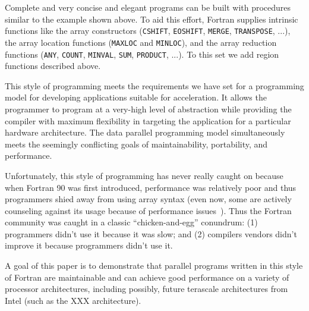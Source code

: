 
Complete and very concise and elegant programs can be built with procedures
similar to the example shown above. To aid this effort, Fortran
supplies intrinsic functions like the array constructors (\texttt{CSHIFT},
\texttt{EOSHIFT}, \texttt{MERGE}, \texttt{TRANSPOSE}, ...), the array location
functions (\texttt{MAXLOC} and \texttt{MINLOC}), and the array reduction
functions (\texttt{ANY}, \texttt{COUNT}, \texttt{MINVAL}, \texttt{SUM},
\texttt{PRODUCT}, ...).  To this set we add region functions described above.

This style of programming meets the requirements we have set for a programming
model for developing applications suitable for acceleration.  It allows the programmer to
program at a very-high level of abstraction while providing the compiler with
maximum flexibility in targeting the application for a particular hardware
architecture.  The data parallel programming model simultaneously meets the
seemingly conflicting goals of maintainability, portability, and performance.

Unfortunately, this style of programming has never really caught on because
when Fortran 90 was first introduced, performance was relatively poor and thus
programmers shied away from using array syntax (even now, some are actively
counseling against its usage because of performance issues~\cite{Cray-SC07}).
Thus the Fortran community was caught in a classic ``chicken-and-egg''
conundrum: (1) programmers didn't use it because it was slow; and (2)
compilers vendors didn't improve it because programmers didn't use it.

A goal of this paper is to demonstrate that parallel programs written in
this style of Fortran are maintainable and can achieve good performance on a
variety of processor architectures, including possibly, future terascale
architectures from Intel (such as the XXX architecture).

